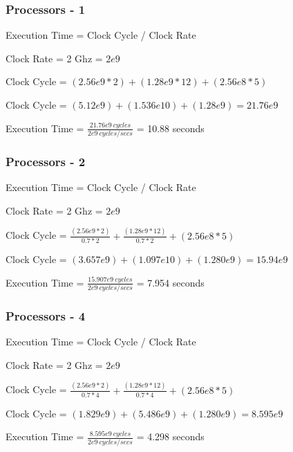 \documentclass{article}
\begin{document}
    \subsubsection*{Processors - 1}

    Execution Time = Clock Cycle / Clock Rate

    Clock Rate = 2 Ghz = $2e9$

    Clock Cycle = $(2.56e9 * 2) + (1.28e9 * 12) + (2.56e8 * 5)$

    Clock Cycle = $(5.12e9) + (1.536e10) + (1.28e9) = 21.76e9$
    \vspace*{6pt}

    Execution Time = $\frac{21.76e9\ cycles}{2e9\ cycles/secs}$ = 10.88 seconds

    \subsubsection*{Processors - 2}

    Execution Time = Clock Cycle / Clock Rate

    Clock Rate = 2 Ghz = $2e9$
    \vspace*{6pt}

    Clock Cycle = $\frac{(2.56e9 * 2)}{0.7 * 2} + \frac{(1.28e9 * 12)}{0.7 * 2} + (2.56e8 * 5)$
    \vspace*{6pt}

    Clock Cycle = $(3.657e9) + (1.097e10) + (1.280e9) = 15.94e9$
    \vspace*{6pt}

    Execution Time = $\frac{15.907e9\ cycles}{2e9\ cycles/secs}$ = 7.954 seconds

    \subsubsection*{Processors - 4}

    Execution Time = Clock Cycle / Clock Rate

    Clock Rate = 2 Ghz = $2e9$
    \vspace*{6pt}

    Clock Cycle = $\frac{(2.56e9 * 2)}{0.7 * 4} + \frac{(1.28e9 * 12)}{0.7 * 4} + (2.56e8 * 5)$
    \vspace*{6pt}

    Clock Cycle = $(1.829e9) + (5.486e9) + (1.280e9) = 8.595e9$
    \vspace*{6pt}

    Execution Time = $\frac{8.595e9\ cycles}{2e9\ cycles/secs}$ = 4.298 seconds
\end{document}
